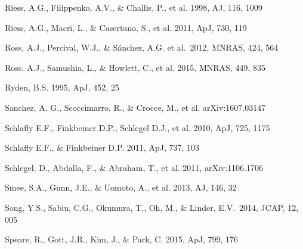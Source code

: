 \documentclass[iop]{emulateapj}
\begin{document}
\begin{thebibliography}{}
Riess, A.G., Filippenko, A.V., \& Challis, P., et al. 1998, AJ, 116, 1009  

Riess, A.G., Macri, L., \& Casertano, S., et al. 2011, ApJ, 730, 119

Ross, A.J., Percival, W.J., \& S{\'a}nchez, A.G. et al.\ 2012, MNRAS, 424, 564 

Ross, A.J., Samushia, L., \& Howlett, C., et al. 2015, MNRAS, 449, 835

Ryden, B.S. 1995, ApJ, 452, 25  





Sanchez, A. G., Scoccimarro, R., \& Crocce, M., et al.
arXiv:1607.03147

Schlafly E.F., Finkbeiner D.P., Schlegel D.J., et al. 2010, ApJ, 725, 1175

Schlafly E.F., \& Finkbeiner D.P. 2011, ApJ, 737, 103


Schlegel, D., Abdalla, F., \& Abraham, T., et al. 2011, arXiv:1106.1706

Smee, S.A., Gunn, J.E., \& Uomoto, A., et al. 2013, AJ, 146, 32

Song, Y.S., Sabiu, C.G., 
Okumura, T., Oh, M., \& Linder, E.V.\ 2014, JCAP, 12, 005 

Speare, R., Gott, J.R., Kim, J., \& Park, C.
2015, ApJ, 799, 176




\end{thebibliography}
\end{document}
